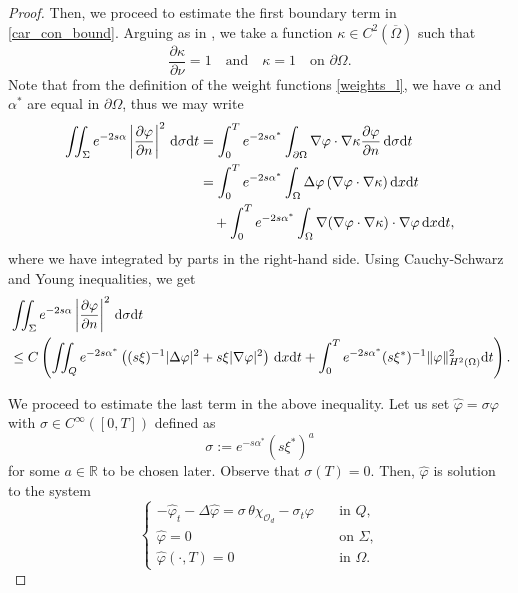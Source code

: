 \documentclass{dcds-bOF}
\theoremstyle{definition}
\def\dx{\,\textnormal{d}x}
\def\dt{\textnormal{d}t}
\def\d{\,\textnormal{d}}
\begin{document}
\begin{proof}
Then, we proceed to estimate the first boundary term in \eqref{car_con_bound}. Arguing as in \cite{duprez_lissy}, we take a function $\kappa\in C^2(\overline \Omega)$ such that
%
\begin{equation*}
\frac{\partial \kappa}{\partial \nu}=1 \quad\text{and}\quad \kappa=1 \quad \text{on } \partial \Omega.
\end{equation*}
%
Note that from the definition of the weight functions \eqref{weights_l}, we have $\alpha$ and $\alpha^*$ are equal in $\partial \Omega$, thus we may write
%
\begin{equation*}
\begin{split}
\iint_{\Sigma}e^{-2s\alpha}\left|\frac{\partial \varphi}{\partial n}\right|^2\d\sigma\dt&=\int_{0}^{T}e^{-2s\alpha^*}\int_{\partial \Omega}\nabla\varphi\cdot \nabla \kappa\frac{\partial \varphi}{\partial n} \d\sigma \dt\\
&=\int_{0}^{T}e^{-2s\alpha^*}\int_{\Omega}\Delta \varphi\,(\nabla\varphi\cdot \nabla \kappa)\dx\dt\\
&\quad +\int_{0}^Te^{-2s\alpha^*}\int_\Omega\nabla (\nabla\varphi\cdot\nabla\kappa)\cdot\nabla \varphi \dx\dt,
\end{split}
\end{equation*}
%
where we have integrated by parts in the right-hand side. Using Cauchy-Schwarz and Young inequalities, we get
%
{\small\begin{equation}\label{estimate_1}
\begin{split}
&\iint_{\Sigma}e^{-2s\alpha}\left|\frac{\partial \varphi}{\partial n}\right|^2\d\sigma \dt\\
&\leq C\left(\iint_Q e^{-2s\alpha^*}\left((s\xi)^{-1}|\Delta \varphi|^2 + s\xi|\nabla \varphi|^2\right)\dx\dt+\int_{0}^{T}e^{-2s\alpha^*}(s\xi^*)^{-1}\|\varphi\|^2_{H^2(\Omega)}\dt\right).
\end{split}
\end{equation}}

We proceed to estimate the last term in the above inequality. Let us set $\widehat \varphi=\sigma\varphi$ with $\sigma\in C^\infty([0,T])$ defined as
%
\begin{equation}\label{rho_def}
\sigma:=e^{-s\alpha^*}(s\xi^*)^a
\end{equation}
%
for some $a\in \mathbb R$ to be chosen later. Observe that $\sigma(T)=0$. Then, $\widehat{\varphi}$ is solution to the system
%
\begin{equation}\label{phi_gorro}
\begin{cases}
-\widehat\varphi_t-\Delta \widehat\varphi=\sigma\,\theta\chi_{\mathcal O_d}-\sigma_t\varphi \quad& \text{in } Q, \\
\widehat\varphi=0 \quad& \text{on } \Sigma, \\
\widehat{\varphi}(\cdot,T)=0 \quad&\text{in } \Omega.
\end{cases}
\end{equation}


\end{proof}
\end{document}
